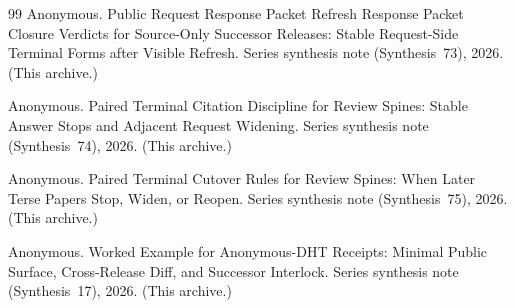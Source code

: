 \documentclass[11pt]{article}
\begin{document}
\begin{thebibliography}{99}
Anonymous.
\newblock Public Request Response Packet Refresh Response Packet Closure Verdicts for Source-Only Successor Releases: Stable Request-Side Terminal Forms after Visible Refresh.
\newblock Series synthesis note (Synthesis~73), 2026. (This archive.)

Anonymous.
\newblock Paired Terminal Citation Discipline for Review Spines: Stable Answer Stops and Adjacent Request Widening.
\newblock Series synthesis note (Synthesis~74), 2026. (This archive.)

Anonymous.
\newblock Paired Terminal Cutover Rules for Review Spines: When Later Terse Papers Stop, Widen, or Reopen.
\newblock Series synthesis note (Synthesis~75), 2026. (This archive.)

Anonymous.
\newblock Worked Example for Anonymous-DHT Receipts: Minimal Public Surface, Cross-Release Diff, and Successor Interlock.
\newblock Series synthesis note (Synthesis~17), 2026. (This archive.)

\end{thebibliography}
\end{document}
